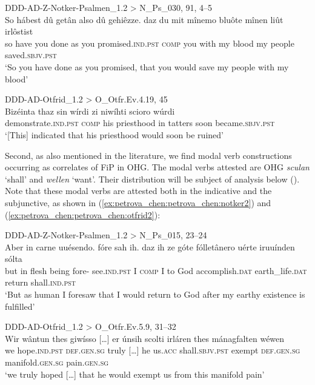 \documentclass[output=paper,colorlinks,citecolor=brown]{langscibook}
\begin{document}

\ea \label{ex:petrova_chen:petrova_chen:11}

    \ea\label{ex:petrova_chen:petrova_chen:notker} DDD-AD-Z-Notker-Psalmen\_1.2 > N\_Ps\_030, 91, 4–5\\
    \gll So hábest dû getân also dû gehiêzze. daz du mit mînemo bluôte mînen liût irlôstist\\
so have you done as you promised.\textsc{ind.pst} \textsc{comp} you with my blood my people saved.\textsc{sbjv.pst}\\
    \glt ‘So you have done as you promised, that you would save my people with my blood’

    \ex \label{ex:petrova_chen:petrova_chen:otfrid} DDD-AD-Otfrid\_1.2 > O\_Otfr.Ev.4.19, 45\\
    \gll Bizéinta thaz sin wírdi zi niwíhti scioro wúrdi\\
demonstrate.\textsc{ind.pst} \textsc{comp} his priesthood in tatters soon became.\textsc{sbjv.pst}\\
    \glt ‘[This] indicated that his priesthood would soon be ruined’
    \z
\z

Second, as also mentioned in the literature, we find modal verb constructions occurring as correlates of FiP in OHG. The modal verbs attested are OHG \textit{sculan} ‘shall’ and \textit{wellen} ‘want’. Their distribution will be subject of analysis below (). Note that these modal verbs are attested both in the indicative and the subjunctive, as shown in (\ref{ex:petrova_chen:petrova_chen:notker2}) and (\ref{ex:petrova_chen:petrova_chen:otfrid2}):

\ea \label{ex:petrova_chen:petrova_chen:12}
    \ea \label{ex:petrova_chen:petrova_chen:notker2} DDD-AD-Z-Notker-Psalmen\_1.2 > N\_Ps\_015, 23–24\\
    \gll Aber in carne uuésendo. fóre sah ih. daz ih ze góte fólletânero uérte iruuínden sólta\\
but in flesh being fore- see.\textsc{ind.pst} I \textsc{comp} I to God accomplish.\textsc{dat} earth\_life.\textsc{dat} return shall.\textsc{ind.pst}\\
    \glt ‘But as human I foresaw that I would return to God after my earthy existence is fulfilled’

    \ex \label{ex:petrova_chen:petrova_chen:otfrid2} DDD-AD-Otfrid\_1.2 > O\_Otfr.Ev.5.9, 31–32\\
\gll Wir wântun thes giwísso […] er únsih scolti irláren thes mánagfalten wéwen\\
we hope.\textsc{ind.pst} \textsc{def.gen.sg} truly […] he us.\textsc{acc} shall.\textsc{sbjv.pst} exempt \textsc{def.gen.sg} manifold.\textsc{gen.sg} pain.\textsc{gen.sg}\\
\glt ‘we truly hoped […] that he would exempt us from this manifold pain’
\z
\z
\end{document}

